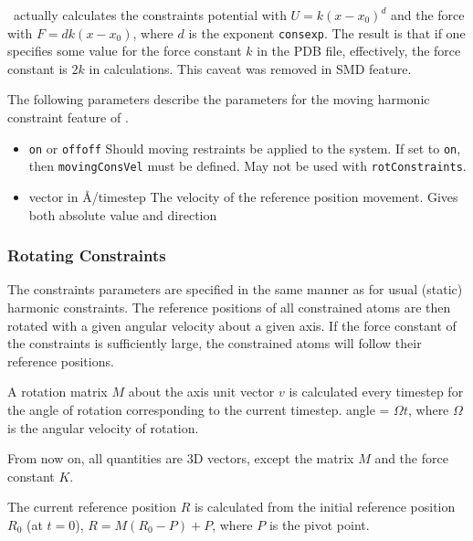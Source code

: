  \NAMD\ actually calculates the constraints
potential with $U = k (x-x_0)^d$ and the force with $F = d k (x-x_0)$,
where $d$ is the exponent {\tt consexp}. The result is that if one
specifies some value for the force constant $k$ in the PDB file,
effectively, the force constant is $2 k$ in calculations. This caveat
was removed in SMD feature.

The following parameters describe the parameters for the
moving harmonic constraint feature of \NAMD.

\begin{itemize}

\item
{}
{{\tt on} or {\tt off}}{{\tt off}}
{Should moving restraints be applied to the system. If set
to {\tt on}, then  {\tt movingConsVel} must be defined.
May not be used with {\tt rotConstraints}.}

\item
{}
{vector in \AA/timestep}
{The velocity of the reference position movement. Gives both absolute
value and direction}

\end{itemize}

\subsubsection{Rotating Constraints}

The constraints parameters are specified in the same manner as for
usual (static) harmonic constraints. The reference positions of all
constrained atoms are then rotated with a given angular velocity
about a given axis. If the force constant of the constraints is
sufficiently
large, the constrained atoms will follow their reference positions.

A rotation matrix $M$ about the axis unit vector $v$ is calculated every
timestep
for the angle of rotation corresponding to the current timestep.
    angle = $\Omega t$,
where $\Omega$ is the angular velocity of rotation.

From now on, all quantities are 3D vectors, except the matrix $M$ and the
force constant $K$.

The current reference position $R$ is calculated from the initial
reference
position $R_0$ (at $t=0$),
    $R = M (R_0 - P) + P$,
where $P$ is the pivot point.

%
%
%

